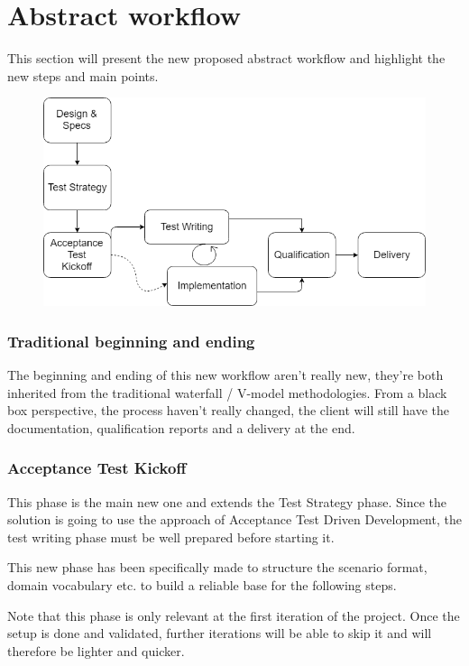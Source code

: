 \section{Abstract workflow}\label{sec:abstract-workflow}

This section will present the new proposed abstract workflow and highlight
the new steps and main points.

\begin{figure}
    \includegraphics[width=\textwidth]{../../resources/images/solution/new_workflow.png}
    \centering
\end{figure}

\subsubsection{Traditional beginning and ending}
The beginning and ending of this new workflow aren't really new, they're both
inherited from the traditional waterfall / V-model methodologies.
From a black box perspective, the process haven't really changed, the client
will still have the documentation, qualification reports and a delivery at
the end.

\subsubsection{Acceptance Test Kickoff}
This phase is the main new one and extends the Test Strategy phase.
Since the solution is going to use the approach of Acceptance Test Driven
Development, the test writing phase must be well prepared before starting it.

This new phase has been specifically made to structure the scenario format,
domain vocabulary etc.
to build a reliable base for the following steps.

Note that this phase is only relevant at the first iteration of the project.
Once the setup is done and validated, further iterations will be able to skip
it and will therefore be lighter and quicker.

